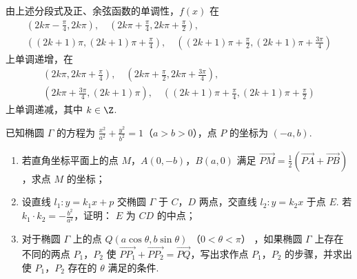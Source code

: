 \begin{solution}
\begin{enumerate}
由上述分段式及正、余弦函数的单调性，\(f(x)\) 在
\[
\begin{gathered}
\left(2k\pi-\frac{\pi}{4},2k\pi\right),\quad \left(2k\pi+\frac{\pi}{4},2k\pi+\frac{\pi}{2}\right),\\
\left((2k+1)\pi,(2k+1)\pi+\frac{\pi}{4}\right),\quad \left((2k+1)\pi+\frac{\pi}{2},(2k+1)\pi+\frac{3\pi}{4}\right)
\end{gathered}
\]
上单调递增，在
\[
\begin{gathered}
\left(2k\pi,2k\pi+\frac{\pi}{4}\right),\quad \left(2k\pi+\frac{\pi}{2},2k\pi+\frac{3\pi}{4}\right),\\
\left(2k\pi+\frac{3\pi}{4},(2k+1)\pi\right),\quad \left((2k+1)\pi+\frac{\pi}{4},(2k+1)\pi+\frac{\pi}{2}\right)
\end{gathered}
\]
上单调递减，其中 \(k\in\Z\).
\end{enumerate}
\end{solution}

\begin{problem}
已知椭圆 \(\Gamma\) 的方程为 \(\frac{x^2}{a^2} + \frac{y^2}{b^2} = 1\)（\(a > b > 0\)），点 \(P\) 的坐标为 \((-a, b)\).

\begin{enumerate}
\item 若直角坐标平面上的点 \(M\)，\(A(0, -b)\)，\(B(a, 0)\) 满足 \(\overrightarrow{PM} = \frac{1}{2} (\overrightarrow{PA} + \overrightarrow{PB})\)，求点 \(M\) 的坐标；
\item 设直线 \(l_1: y = k_1x + p\) 交椭圆 \(\Gamma\) 于 \(C\)，\(D\) 两点，交直线 \(l_2: y = k_2x\) 于点 \(E\). 若 \(k_1 \cdot k_2 = -\frac{b^2}{a^2}\)，证明： \(E\) 为 \(CD\) 的中点；
\item 对于椭圆 \(\Gamma\) 上的点 \(Q(a\cos \theta, b\sin \theta)\) （\(0 < \theta < \pi\)） ，如果椭圆 \(\Gamma\) 上存在不同的两点 \(P_1\)，\(P_2\) 使 \(\overrightarrow{PP_1} + \overrightarrow{PP_2} = \overrightarrow{PQ}\)，写出求作点 \(P_1\)，\(P_2\) 的步骤，并求出使 \(P_1\)，\(P_2\) 存在的 \(\theta\) 满足的条件.
\end{enumerate}
\end{problem}

